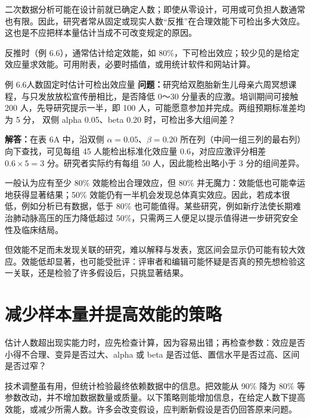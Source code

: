 二次数据分析可能在设计前就已确定人数；即使从零设计，可用或可负担人数通常也有限。因此，研究者常从固定或现实人数“反推”在合理效能下可检出多大效应。这也是不应把样本量估计当成不可改变规定的原因。

反推时（例 6.6），通常估计给定效能，如 80\%，下可检出效应；较少见的是给定效应量求效能。可用附表，必要时插值，或用统计软件和网站计算。
\begin{bookbox}{例 6.6\quad 人数固定时估计可检出效应量}
\textbf{问题：}研究给双胞胎新生儿母亲六周冥想课程，与只发放放松宣传册相比，是否降低 0～30 分量表的应激。培训期间可接触 200 人，先导研究提示一半，即 100 人，可能愿意参加并完成。两组预期标准差均为 5 分，
双侧 alpha 0.05、beta 0.20 时，可检出多大组间差？

\textbf{解答：}在表 6A 中，沿双侧 $\alpha=0.05$、$\beta=0.20$ 所在列（中间一组三列的最右列）向下查找，可见每组 45 人能检出标准化效应量 0.6，对应应激评分相差 $0.6\times5=3$ 分。研究者实际约有每组 50 人，因此能检出略小于 3 分的组间差异。
\end{bookbox}
一般认为应有至少 80\% 效能检出合理效应，但 80\% 并无魔力：效能低也可能幸运地获得显著结果；50\% 效能仍有一半机会发现总体真实效应。因此，若成本很低，例如分析已有数据，低于 80\% 也可能值得。某些研究，例如新疗法使长期难治肺动脉高压的压力降低超过 50\%，只需两三人便足以提示值得进一步研究安全性及临床结局。

但效能不足而未发现关联的研究，难以解释与发表，宽区间会显示仍可能有较大效应。效能低却显著，也可能受批评：评审者和编辑可能怀疑是否真的预先想检验这一关联，还是检验了许多假设后，只挑显著结果。

\section{减少样本量并提高效能的策略}
估计人数超出现实能力时，应先检查计算，因为容易出错；再检查参数：效应是否小得不合理、变异是否过大、alpha 或 beta 是否过低、置信水平是否过高、区间是否过窄？

技术调整虽有用，但统计检验最终依赖数据中的信息。把效能从 90\% 降为 80\% 等参数改动，并不增加数据数量或质量。以下策略则能增加信息，在给定人数下提高效能，或减少所需人数。许多会改变假设，应判断新假设是否仍回答原来问题。

